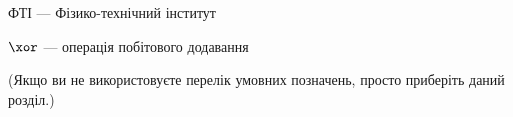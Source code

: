 ФТІ --- Фізико-технічний інститут

$\xor$ --- операція побітового додавання  %


(Якщо ви не використовуєте перелік умовних позначень, просто приберіть 
даний розділ.)
